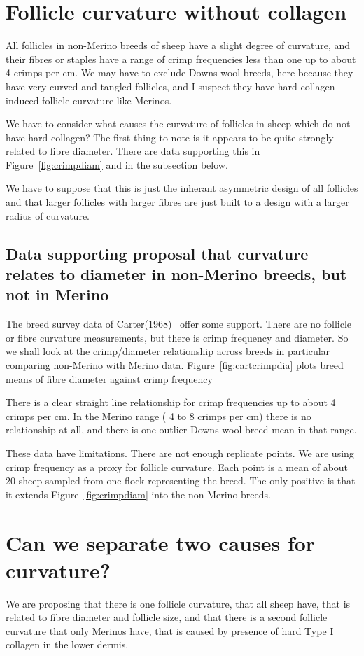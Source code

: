 \documentclass{article}
\begin{document}
\section{Follicle curvature without collagen}
All follicles in non-Merino breeds of sheep have a slight degree of curvature, and their fibres or staples have a range of crimp frequencies less than one up to about 4 crimps per cm.  We may have to exclude Downs wool breeds, here because they have very curved and tangled follicles, and I suspect they have hard collagen induced follicle curvature like Merinos.

We have to consider what causes the curvature of follicles in sheep which do not have hard collagen? The first thing to note is it appears to be quite strongly related to fibre diameter. There are data supporting this in Figure~\ref{fig:crimpdiam} and in the subsection below.

We have to suppose that this is just the inherant asymmetric design of all follicles and that larger follicles with larger fibres are just built to a design with a larger radius of curvature.

\subsection{Data supporting proposal that curvature relates to diameter in non-Merino breeds, but not in Merino}
The breed survey data of Carter(1968)~\cite{carter-1968} offer some support. There are no follicle or fibre curvature measurements, but there is crimp frequency and diameter. So we shall look at the crimp/diameter relationship  across breeds in particular comparing non-Merino with Merino data. Figure~\ref{fig:cartcrimpdia} plots breed means of fibre diameter against crimp frequency

There is a clear straight line relationship for crimp frequencies up to about 4 crimps per cm. In the Merino range ( 4 to 8 crimps per cm) there is no relationship at all, and there is one outlier Downs wool breed mean in that range. 

These data have limitations. There are not enough replicate points. We are using crimp frequency as a proxy for follicle curvature. Each point is a mean of about 20 sheep sampled from one flock representing the breed. The only positive is that it extends Figure~\ref{fig:crimpdiam} into the non-Merino breeds.

\section{Can we separate two causes for curvature?}
We are proposing that there is one follicle curvature, that all sheep have, that is related to fibre diameter and follicle size, and that there is a second follicle curvature that only Merinos have, that is caused by  presence of hard Type I collagen in the lower dermis.
\end{document}
